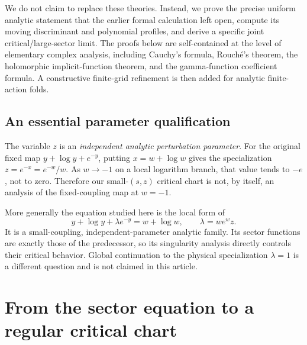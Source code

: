 \documentclass[11pt,a4paper]{article}
\theoremstyle{definition}
\theoremstyle{remark}
\begin{document}
We do not claim to replace these theories. Instead, we prove the precise
uniform analytic statement that the earlier formal calculation left open,
compute its moving discriminant and polynomial profiles, and derive a
specific joint critical/large-sector limit. The proofs below are
self-contained at the level of elementary complex analysis, including
Cauchy's formula, Rouch\'e's theorem, the holomorphic implicit-function
theorem, and the gamma-function coefficient formula. A constructive
finite-grid refinement is then added for analytic finite-action folds.

\subsection{An essential parameter qualification}
\label{sec:qualification}
The variable $z$ is an \emph{independent analytic perturbation parameter}.
For the original fixed map $y+\log y+e^{-y}$, putting
$x=w+\log w$ gives the specialization $z=e^{-x}=e^{-w}/w$.
As $w\to-1$ on a local logarithm branch, that value tends to $-e$, not to
zero. Therefore our small-$(s,z)$ critical chart is not, by itself, an
analysis of the fixed-coupling map at $w=-1$.

More generally the equation studied here is the local form of
\[
 y+\log y+\lambda e^{-y}=w+\log w,
 \qquad \lambda=we^wz.
\]
It is a small-coupling, independent-parameter analytic family. Its sector
functions are exactly those of the predecessor, so its singularity
analysis directly controls their critical behavior. Global continuation
to the physical specialization $\lambda=1$ is a different question and
is not claimed in this article.

\section{From the sector equation to a regular critical chart}
\label{sec:chart}
\end{document}
